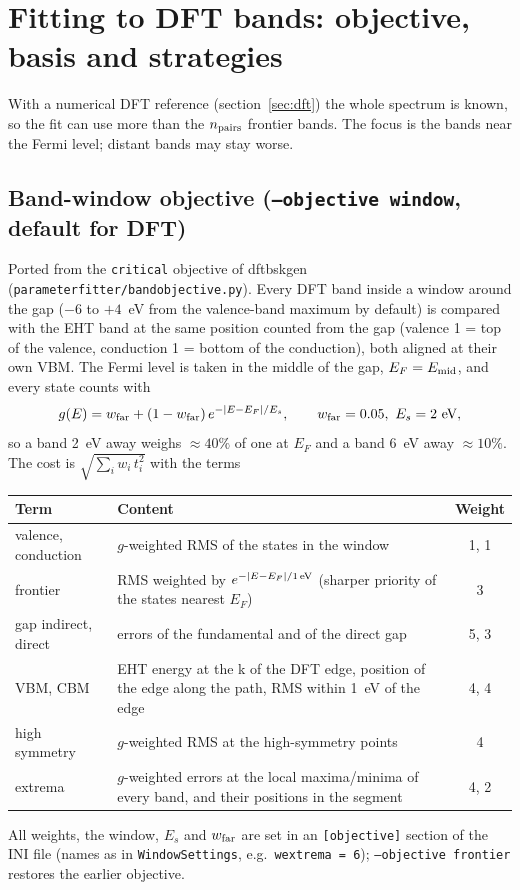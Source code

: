 \documentclass[11pt,a4paper]{article}
\newcommand{\cmd}[1]{\texttt{#1}}
\renewcommand{\_}{\origunderscore\allowbreak}
\begin{document}
\section{Fitting to DFT bands: objective, basis and strategies}\label{sec:strategies}

With a numerical DFT reference (section~\ref{sec:dft}) the whole spectrum is known, so the fit can use more than
the $n_{\rm pairs}$ frontier bands. The focus is the bands near the Fermi level; distant bands may stay worse.

\subsection{Band-window objective (\cmd{--objective window}, default for DFT)}
Ported from the \cmd{critical} objective of dftb\_sk\_gen (\cmd{parameter\_fitter/band\_objective.py}). Every DFT
band inside a window around the gap ($-6$ to $+4$~eV from the valence-band maximum by default) is compared with the EHT
band at the same position counted from the gap (valence 1 = top of the valence, conduction 1 = bottom of the
conduction), both aligned at their own VBM. The Fermi level is taken in the middle of the gap, $E_F=E_{\rm mid}$, and every
state counts with
\[
g(E)=w_{\rm far}+(1-w_{\rm far})\,e^{-|E-E_F|/E_s},\qquad w_{\rm far}=0.05,\ E_s=2~\text{eV},
\]
so a band 2~eV away weighs $\approx 40\%$ of one at $E_F$ and a band 6~eV away $\approx 10\%$. The cost is
$\sqrt{\sum_i w_i\,t_i^2}$ with the terms
\begin{center}\small
\begin{tabularx}{\textwidth}{l L c}
\toprule
Term & Content & Weight \\
\midrule
valence, conduction & $g$-weighted RMS of the states in the window & 1, 1 \\
frontier & RMS weighted by $e^{-|E-E_F|/1\,{\rm eV}}$ (sharper priority of the states nearest $E_F$) & 3 \\
gap indirect, direct & errors of the fundamental and of the direct gap & 5, 3 \\
VBM, CBM & EHT energy at the k of the DFT edge, position of the edge along the path, RMS within 1~eV of the edge & 4, 4 \\
high symmetry & $g$-weighted RMS at the high-symmetry points & 4 \\
extrema & $g$-weighted errors at the local maxima/minima of every band, and their positions in the segment & 4, 2 \\
\bottomrule
\end{tabularx}\end{center}
All weights, the window, $E_s$ and $w_{\rm far}$ are set in an \cmd{[objective]} section of the INI file (names as in
\cmd{WindowSettings}, e.g.\ \cmd{w\_extrema = 6}); \cmd{--objective frontier} restores the earlier objective.
\end{document}
